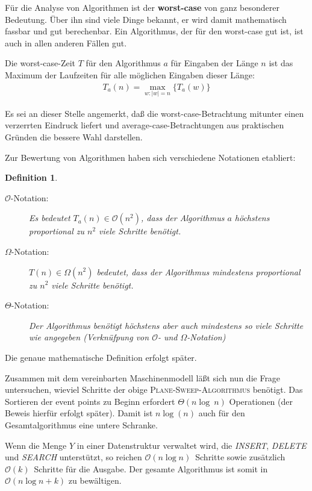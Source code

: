 \documentclass[ngerman,draft,parskip=half*,twoside]{scrreprt}
\theoremstyle{break}
\newtheorem{definition}{Definition}[chapter]
\theoremstyle{nonumberbreak}
\newcommand*{\OO}{\mathcal{O}}      %
\begin{document}
Für die Analyse von Algorithmen ist der \textbf{worst-case} von ganz
besonderer Bedeutung. Über ihn sind viele Dinge bekannt, er wird
damit mathematisch fassbar und gut berechenbar. Ein Algorithmus,
der für den worst-case gut ist, ist auch in allen anderen Fällen gut.

Die worst-case-Zeit $T$ für den Algorithmus $a$ für Eingaben der Länge $n$
ist das Maximum der Laufzeiten für alle möglichen Eingaben dieser
Länge:
\begin{gather*}
  T_a(n) = \max_{w\colon |w|=n}\big\{T_a(w)\big\}
\end{gather*}

Es sei an dieser Stelle angemerkt, daß die worst-case-Betrachtung mitunter
einen verzerrten Eindruck liefert und average-case-Betrachtungen aus
praktischen Gründen die bessere Wahl darstellen.

Zur Bewertung von Algorithmen haben sich verschiedene Notationen
etabliert:
\begin{definition}
  \begin{description}
   \item[$\OO$-Notation:]
    Es bedeutet $T_a(n) \in \OO(n^2)$, dass der Algorithmus $a$
    \emph{höchstens} proportional zu $n^2$ viele Schritte benötigt. 
   \item[$\Omega$-Notation:]
    $T(n) \in \Omega (n^2)$ bedeutet, dass der Algorithmus \emph{mindestens}
    proportional zu $n^2$ viele Schritte benötigt. 
   \item[$\Theta$-Notation:]
    Der Algorithmus benötigt höchstens aber auch mindestens so viele
    Schritte wie angegeben (Verknüfpung von $\OO$- und $\Omega$-Notation)
  \end{description}
\end{definition}
Die genaue mathematische Definition erfolgt später.

Zusammen mit dem vereinbarten
Maschinenmodell läßt sich nun die Frage untersuchen, wieviel Schritte
der obige \textsc{Plane-Sweep-Algorithmus} benötigt.
Das Sortieren der event points zu Beginn erfordert $\Theta(n\log~n)$
Operationen (der Beweis hierfür erfolgt später). Damit ist $n\log(n)$
auch für den Gesamtalgorithmus eine untere Schranke.

Wenn die Menge $Y$ in einer Datenstruktur verwaltet wird, die 
\textit{INSERT}, \textit{DELETE} und \textit{SEARCH} unterstützt, so
reichen $\OO(n \log n)$~Schritte sowie zusätzlich $\OO(k)$~Schritte für
die Ausgabe. Der gesamte Algorithmus ist somit in $\OO(n\log n+k)$ zu
bewältigen.
\end{document}
